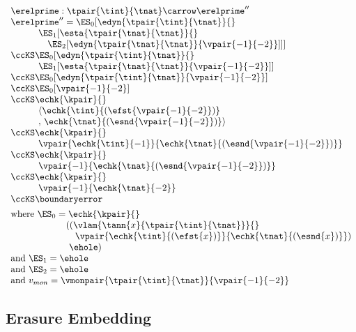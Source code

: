 $\begin{array}{l}
  \erelprime : \tpair{\tint}{\tnat} \carrow \erelprime''
\\\erelprime'' = \ES_0[\edyn{\tpair{\tint}{\tnat}}{}
\\\qquad\quad \ES_1[\esta{\tpair{\tnat}{\tnat}}{}
\\\qquad\quad\quad \ES_2[\edyn{\tpair{\tnat}{\tnat}}{\vpair{-1}{-2}}]]]
\\\ccKS \ES_0[\edyn{\tpair{\tint}{\tnat}}{}
\\\qquad\quad \ES_1[\esta{\tpair{\tnat}{\tnat}}{\vpair{-1}{-2}}]]
\\\ccKS \ES_0[\edyn{\tpair{\tint}{\tnat}}{\vpair{-1}{-2}}]
\\\ccKS \ES_0[\vpair{-1}{-2}]
\\\ccKS \echk{\kpair}{}
\\\qquad\quad \langle{\echk{\tint}{(\efst{\vpair{-1}{-2}})}}
\\\qquad\quad ,\,{\echk{\tnat}{(\esnd{\vpair{-1}{-2}})}}\rangle
\\\ccKS \echk{\kpair}{}
\\\qquad\quad \vpair{\echk{\tint}{{-1}}}{\echk{\tnat}{(\esnd{\vpair{-1}{-2}})}}
\\\ccKS \echk{\kpair}{}
\\\qquad\quad \vpair{-1}{\echk{\tnat}{(\esnd{\vpair{-1}{-2}})}}
\\\ccKS \echk{\kpair}{}
\\\qquad\quad \vpair{-1}{\echk{\tnat}{{-2}}}
\\\ccKS \boundaryerror
\\[1ex]
  \mbox{where } \ES_0 = \echk{\kpair}{}
\\\qquad\qquad\qquad ((\vlam{\tann{x}{\tpair{\tint}{\tnat}}}{}
\\\qquad\qquad\qquad\quad {\vpair{\echk{\tint}{(\efst{x})}}{\echk{\tnat}{(\esnd{x})}}})
\\\qquad\qquad\qquad\ {\ehole})
\\\mbox{and } \ES_1 = \ehole
\\\mbox{and } \ES_2 = \ehole
\\\mbox{and } v_{mon} = \vmonpair{\tpair{\tint}{\tnat}}{\vpair{-1}{-2}}
\end{array}$

\subsection{Erasure Embedding}

